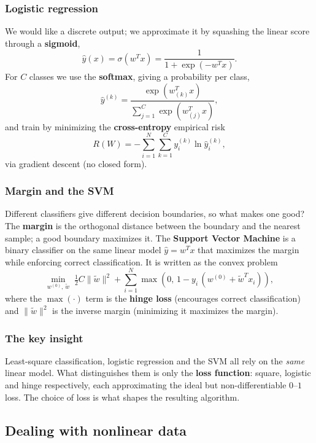 \subsubsection{Logistic regression}
We would like a discrete output; we approximate it by squashing the linear score
through a \textbf{sigmoid},
\[
  \hat{y}(x) = \sigma(w^T x) = \frac{1}{1 + \exp(-w^T x)} .
\]
For $C$ classes we use the \textbf{softmax}, giving a probability per class,
\[
  \hat{y}^{(k)} = \frac{\exp(w_{(k)}^T x)}{\sum_{j=1}^{C} \exp(w_{(j)}^T x)} ,
\]
and train by minimizing the \textbf{cross-entropy} empirical risk
\[
  R(W) = -\sum_{i=1}^{N} \sum_{k=1}^{C} y_i^{(k)} \ln \hat{y}_i^{(k)} ,
\]
via gradient descent (no closed form).

\subsubsection{Margin and the SVM}
Different classifiers give different decision boundaries, so what makes one
good? The \textbf{margin} is the orthogonal distance between the boundary and the
nearest sample; a good boundary maximizes it. The \textbf{Support Vector
Machine} is a binary classifier on the same linear model $\hat{y} = w^T x$ that
maximizes the margin while enforcing correct classification. It is written as
the convex problem
\[
  \min_{w^{(0)},\,\tilde{w}} \;
  \tfrac{1}{2}C\|\tilde{w}\|^2
  + \sum_{i=1}^{N} \max\!\left(0,\, 1 - y_i\,(w^{(0)} + \tilde{w}^T x_i)\right) ,
\]
where the $\max(\cdot)$ term is the \textbf{hinge loss} (encourages correct
classification) and $\|\tilde{w}\|^2$ is the inverse margin (minimizing it
maximizes the margin).

\subsubsection{The key insight}
\begin{definition}
  Least-square classification, logistic regression and the SVM all rely on the
  \textit{same} linear model. What distinguishes them is only the
  \textbf{loss function}: square, logistic and hinge respectively, each
  approximating the ideal but non-differentiable $0$--$1$ loss. The choice of
  loss is what shapes the resulting algorithm.
\end{definition}

\subsection{Dealing with nonlinear data}
